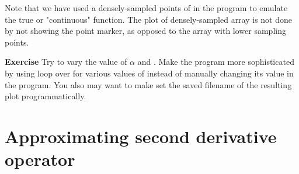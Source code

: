 Note that we have used a densely-sampled points of  in the
program to emulate the true or "continuous" function. The plot of densely-sampled
array is not done by not showing the point marker, as opposed to the array with
lower sampling points.

\textbf{Exercise} Try to vary the value of $\alpha$ and .
Make the program more sophisticated
by using loop over for various values of  instead of manually changing its value
in the program. You also may want to make set the saved filename of the resulting
plot programmatically.



\section{Approximating second derivative operator}


